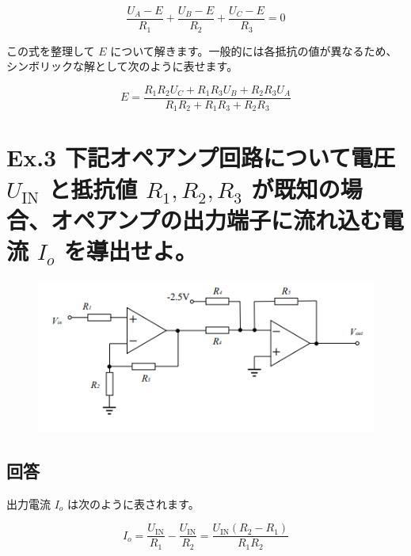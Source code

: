 \documentclass{article}
\begin{document}
\[
\frac{U_A - E}{R_1} + \frac{U_B - E}{R_2} + \frac{U_C - E}{R_3} = 0
\]

この式を整理して \(E\) について解きます。一般的には各抵抗の値が異なるため、シンボリックな解として次のように表せます。

\[
E = \frac{R_1 R_2 U_C + R_1 R_3 U_B + R_2 R_3 U_A}{R_1 R_2 + R_1 R_3 + R_2 R_3}
\]

\newpage  %

\section*{Ex.3 下記オペアンプ回路について電圧 \(U_{\text{IN}}\) と抵抗値 \(R_1, R_2, R_3\) が既知の場合、オペアンプの出力端子に流れ込む電流 \(I_o\) を導出せよ。}
\begin{figure}[H]
    \centering
    \includegraphics[width=0.7\linewidth]{e3.png}
\end{figure}

\subsection*{回答}
出力電流 \(I_o\) は次のように表されます。

\[
I_o = \frac{U_{\text{IN}}}{R_1} - \frac{U_{\text{IN}}}{R_2} = \frac{U_{\text{IN}}(R_2 - R_1)}{R_1 R_2}
\]
\end{document}
